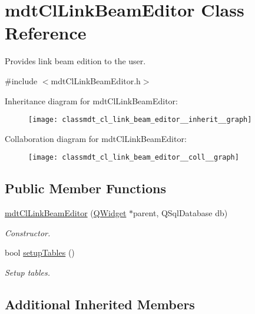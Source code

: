 \hypertarget{classmdt_cl_link_beam_editor}{\section{mdt\-Cl\-Link\-Beam\-Editor Class Reference}
\label{classmdt_cl_link_beam_editor}
}


Provides link beam edition to the user.  




{\ttfamily \#include $<$mdt\-Cl\-Link\-Beam\-Editor.\-h$>$}



Inheritance diagram for mdt\-Cl\-Link\-Beam\-Editor\-:\nopagebreak
\begin{figure}[H]
\begin{center}
\leavevmode
\texttt{[image: classmdt\_cl\_link\_beam\_editor\_\_inherit\_\_graph]}
\end{center}
\end{figure}


Collaboration diagram for mdt\-Cl\-Link\-Beam\-Editor\-:\nopagebreak
\begin{figure}[H]
\begin{center}
\leavevmode
\texttt{[image: classmdt\_cl\_link\_beam\_editor\_\_coll\_\_graph]}
\end{center}
\end{figure}
\subsection*{Public Member Functions}
\begin{DoxyCompactItemize}
\item 
\hyperlink{classmdt_cl_link_beam_editor_a95374fdb1b10c69ddbc64418e729adee}{mdt\-Cl\-Link\-Beam\-Editor} (\hyperlink{class_q_widget}{Q\-Widget} $\ast$parent, Q\-Sql\-Database db)
\begin{DoxyCompactList}\small\item\em Constructor. \end{DoxyCompactList}\item 
bool \hyperlink{classmdt_cl_link_beam_editor_aff3668706e304470e55165d036feae80}{setup\-Tables} ()
\begin{DoxyCompactList}\small\item\em Setup tables. \end{DoxyCompactList}\end{DoxyCompactItemize}
\subsection*{Additional Inherited Members}


